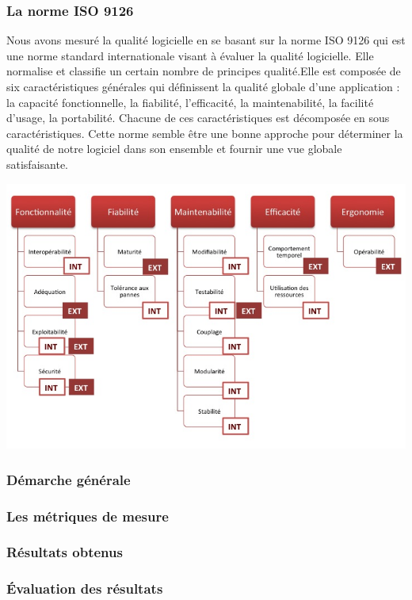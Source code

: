 \documentclass{scrartcl}
\begin{document}
\subsubsection{La norme ISO 9126}
Nous avons mesuré la qualité logicielle en se basant sur la norme ISO 9126 qui est une norme standard internationale visant à évaluer
la qualité logicielle. Elle normalise et classifie un certain nombre de principes qualité.Elle est composée de six caractéristiques générales qui définissent la qualité globale d'une application : la capacité fonctionnelle, la fiabilité, l'efficacité, la maintenabilité, la facilité d'usage, la portabilité. Chacune de ces caractéristiques est décomposée en sous caractéristiques.
Cette norme semble être une bonne approche pour déterminer la qualité de notre logiciel dans son ensemble et fournir une vue globale satisfaisante.

 \begin{center}
 	\includegraphics[width=0.60\columnwidth]{iso9126}
 	\label{fig-label}
 \end{center}
\subsubsection{Démarche générale}

 
\subsubsection{Les métriques de mesure}

\subsubsection{Résultats obtenus}

\subsubsection{Évaluation des résultats}
\end{document}
